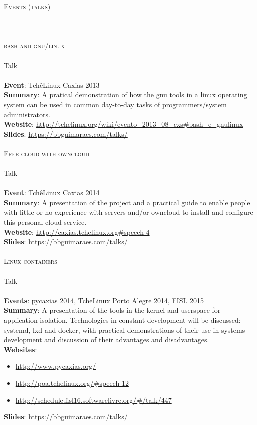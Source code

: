 \noindent
\textsc{\Huge Events (talks)} \\\\\\\\
\noindent
\textsc{\Large bash and gnu/linux} \\\\
Talk \\\\
\textbf{Event}: TchêLinux Caxias  2013 \\
\textbf{Summary}:
    A pratical demonstration of how the gnu tools in a linux operating system
    can be used in common day-to-day tasks of programmers/system
    administrators. \\
\textbf{Website}:
    \url{http://tchelinux.org/wiki/evento_2013_08_cxs#bash_e_gnulinux} \\
\textbf{Slides}: \url{https://bbguimaraes.com/talks/} \\\\

\noindent
\textsc{\Large Free cloud with owncloud} \\\\
Talk \\\\
\textbf{Event}: TchêLinux Caxias 2014 \\
\textbf{Summary}:
    A presentation of the project and a practical guide to enable people
    with little or no experience with servers and/or owncloud to install and
    configure this personal cloud service. \\
\textbf{Website}: \url{http://caxias.tchelinux.org#speech-4} \\
\textbf{Slides}: \url{https://bbguimaraes.com/talks/} \\\\

\noindent
\textsc{\Large Linux containers} \\\\
Talk \\\\
\textbf{Events}: pycaxias 2014, TcheLinux Porto Alegre 2014, FISL 2015 \\
\textbf{Summary}:
    A presentation of the tools in the kernel and userspace for application
    isolation. Technologies in constant development will be discussed: systemd,
    lxd and docker, with practical demonstrations of their use in systems
    development and discussion of their advantages and disadvantages. \\
\textbf{Websites}:
\begin{itemize}
    \vspace{-2.5mm}
    \itemsep-1mm
    \item \url{http://www.pycaxias.org/}
    \item \url{http://poa.tchelinux.org/#speech-12}
    \item \url{http://schedule.fisl16.softwarelivre.org/#/talk/447}
    \vspace{-2.5mm}
\end{itemize}
\textbf{Slides}: \url{https://bbguimaraes.com/talks/}

